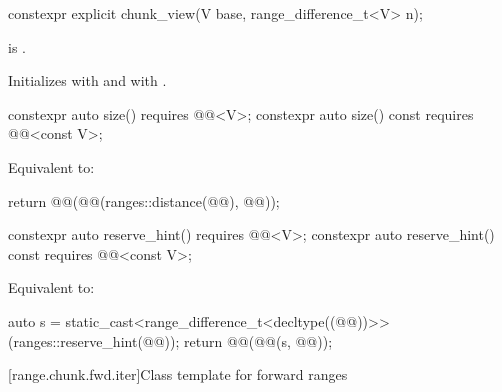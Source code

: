 %
\begin{itemdecl}
constexpr explicit chunk_view(V base, range_difference_t<V> n);
\end{itemdecl}

\begin{itemdescr}
\pnum
\expects
{} is .

\pnum
\effects
Initializes  with  and
 with .
\end{itemdescr}

%
\begin{itemdecl}
constexpr auto size() requires @@<V>;
constexpr auto size() const requires @@<const V>;
\end{itemdecl}

\begin{itemdescr}
\pnum
\effects
Equivalent to:
\begin{codeblock}
return @@(@@(ranges::distance(@@), @@));
\end{codeblock}
\end{itemdescr}

%
\begin{itemdecl}
constexpr auto reserve_hint() requires @@<V>;
constexpr auto reserve_hint() const requires @@<const V>;
\end{itemdecl}

\begin{itemdescr}
\pnum
\effects
Equivalent to:
\begin{codeblock}
auto s = static_cast<range_difference_t<decltype((@@))>>(ranges::reserve_hint(@@));
return @@(@@(s, @@));
\end{codeblock}
\end{itemdescr}

[range.chunk.fwd.iter]{Class template  for forward ranges}

